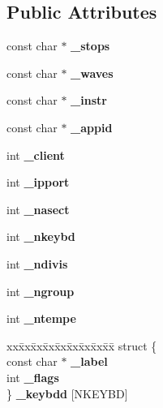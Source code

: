 \subsection*{Public Attributes}
\begin{DoxyCompactItemize}
\item 
\mbox{\label{class_m__ifc__init_a3438ff1f5bf9891186d9664e6e6b7658}} 
const char $\ast$ {\bfseries \+\_\+stops}
\item 
\mbox{\label{class_m__ifc__init_a0ad62fa400bed5ca2675b6849ac9a35f}} 
const char $\ast$ {\bfseries \+\_\+waves}
\item 
\mbox{\label{class_m__ifc__init_aa73314527c8f29e7037278043c42ed76}} 
const char $\ast$ {\bfseries \+\_\+instr}
\item 
\mbox{\label{class_m__ifc__init_ab17f4306c9f16699f10fdc603ab5d505}} 
const char $\ast$ {\bfseries \+\_\+appid}
\item 
\mbox{\label{class_m__ifc__init_a361c8808ea5aaa7a12b39438bc0eba50}} 
int {\bfseries \+\_\+client}
\item 
\mbox{\label{class_m__ifc__init_a3efea7b3fb537cfc2e27d9e3b739e242}} 
int {\bfseries \+\_\+ipport}
\item 
\mbox{\label{class_m__ifc__init_aaeeb42d8f99dbfd1b2addd9ce2b85757}} 
int {\bfseries \+\_\+nasect}
\item 
\mbox{\label{class_m__ifc__init_aaaec466e66936b331c184a8c258fd4a0}} 
int {\bfseries \+\_\+nkeybd}
\item 
\mbox{\label{class_m__ifc__init_a2a1fef330777ce08e0cc62befe5179c8}} 
int {\bfseries \+\_\+ndivis}
\item 
\mbox{\label{class_m__ifc__init_afb72d72710b958d9198959699d526501}} 
int {\bfseries \+\_\+ngroup}
\item 
\mbox{\label{class_m__ifc__init_a6e79cc5dcd6a37c0ffb4a57ffb480a77}} 
int {\bfseries \+\_\+ntempe}
\item 
\mbox{\label{class_m__ifc__init_a575dee19ab99b9c364d05f489060b648}} 
\begin{tabbing}
xx\=xx\=xx\=xx\=xx\=xx\=xx\=xx\=xx\=\kill
struct \{\\
\>const char $\ast$ {\bfseries \_label}\\
\>int {\bfseries \_flags}\\
\} {\bfseries \_keybdd} \mbox{[}NKEYBD\mbox{]}\\


\end{tabbing}
\end{DoxyCompactItemize}
